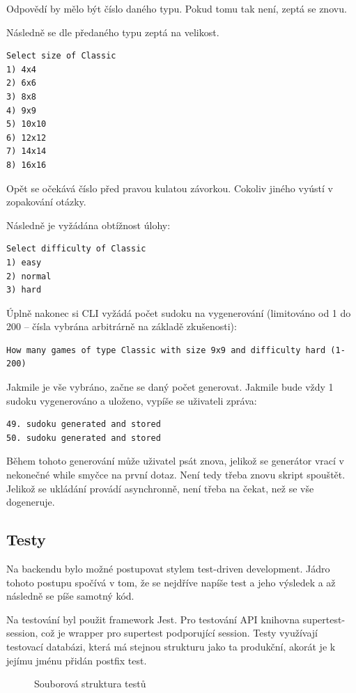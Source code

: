 \documentclass[a4paper,oneside,12pt]{report}
\begin{document}
Odpovědí by mělo být číslo daného typu. Pokud tomu tak není, zeptá se znovu. 

Následně se dle předaného typu zeptá na velikost. 
\begin{lstlisting}[breaklines, basicstyle=\tiny]
Select size of Classic
1) 4x4
2) 6x6
3) 8x8
4) 9x9
5) 10x10
6) 12x12
7) 14x14
8) 16x16
\end{lstlisting}
Opět se očekává číslo před pravou kulatou závorkou. Cokoliv jiného vyústí v zopakování otázky.

Následně je vyžádána obtížnost úlohy:
\begin{lstlisting}[breaklines, basicstyle=\tiny]
Select difficulty of Classic
1) easy
2) normal
3) hard
\end{lstlisting}

Úplně nakonec si CLI vyžádá počet sudoku na vygenerování (limitováno od 1 do 200 -- čísla vybrána arbitrárně na základě zkušenosti): 
\begin{lstlisting}[breaklines, basicstyle=\tiny]
How many games of type Classic with size 9x9 and difficulty hard (1-200)
\end{lstlisting}

Jakmile je vše vybráno, začne se daný počet generovat. Jakmile bude vždy 1 sudoku vygenerováno a uloženo, vypíše se uživateli zpráva:
\begin{lstlisting}[breaklines, basicstyle=\tiny]
49. sudoku generated and stored
50. sudoku generated and stored
\end{lstlisting}

Během tohoto generování může uživatel psát znova, jelikož se generátor vrací v nekonečné while smyčce na první dotaz. Není tedy třeba znovu skript spouštět. Jelikož se ukládání provádí asynchronně, není třeba na čekat, než se vše dogeneruje.

\subsection{Testy}
Na backendu bylo možné postupovat stylem test-driven development. Jádro tohoto postupu spočívá v tom, že se nejdříve napíše test a jeho výsledek a až následně se píše samotný kód. 

Na testování byl použit framework Jest. Pro testování API knihovna supertest-session, což je wrapper pro supertest podporující session. Testy využívají testovací databázi, která má stejnou strukturu jako ta produkční, akorát je k jejímu jménu přidán postfix test. 

\begin{figure}[H]
   \caption[Souborová struktura testů]{Souborová struktura testů}
   \label{fig:sqlClasses}
\end{figure}
\end{document}

